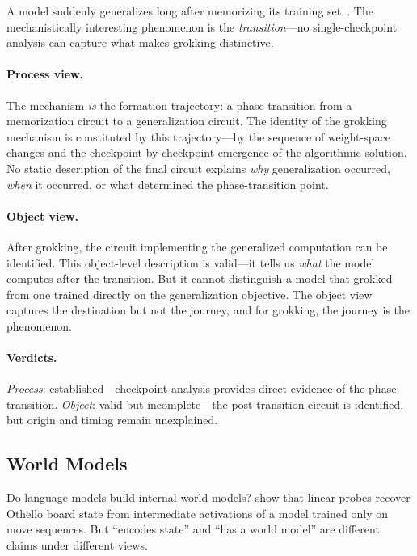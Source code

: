 \documentclass{article}
\begin{document}
A model suddenly generalizes long after memorizing its training
set~\citep{power2022grokking, nanda2023grokking}. The mechanistically
interesting phenomenon is the \emph{transition}---no single-checkpoint
analysis can capture what makes grokking distinctive.

\paragraph{Process view.}
The mechanism \emph{is} the formation trajectory: a phase transition from
a memorization circuit to a generalization circuit. The identity of the
grokking mechanism is constituted by this trajectory---by the sequence of
weight-space changes and the checkpoint-by-checkpoint emergence of the
algorithmic solution. No static description of the final circuit explains
\emph{why} generalization occurred, \emph{when} it occurred, or what
determined the phase-transition point.

\paragraph{Object view.}
After grokking, the circuit implementing the generalized computation can
be identified. This object-level description is valid---it tells us
\emph{what} the model computes after the transition. But it cannot
distinguish a model that grokked from one trained directly on the
generalization objective. The object view captures the destination but
not the journey, and for grokking, the journey is the phenomenon.

\paragraph{Verdicts.}
\emph{Process}: established---checkpoint analysis provides direct
evidence of the phase transition.
\emph{Object}: valid but incomplete---the post-transition circuit is
identified, but origin and timing remain unexplained.


\subsection{World Models}\label{app:cs_world}

Do language models build internal world models?
\citet{li2022othello} show that linear probes recover Othello board
state from intermediate activations of a model trained only on move
sequences. But ``encodes state'' and ``has a world model'' are
different claims under different views.
\end{document}
